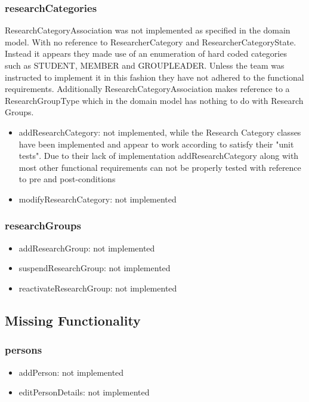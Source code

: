 \documentclass{article}
\begin{document}
		\subsubsection{researchCategories}
		ResearchCategoryAssociation was not implemented as specified in the domain model. With no reference to ResearcherCategory and ResearcherCategoryState. Instead it appears they made use of an enumeration of hard coded categories such as STUDENT, MEMBER and GROUPLEADER. Unless the team was instructed to implement it in this fashion they have not adhered to the functional requirements. Additionally ResearchCategoryAssociation makes reference to a ResearchGroupType which in the domain model has nothing to do with Research Groups.
			\begin{itemize}
			\item addResearchCategory: not implemented, while the Research Category classes have been implemented and appear to work according to satisfy their "unit tests". Due to their lack of implementation addResearchCategory along with most other functional requirements can not be properly tested with reference to pre and post-conditions
			\item modifyResearchCategory: not implemented
			\end{itemize}

		\subsubsection{researchGroups}
			\begin{itemize}
			\item addResearchGroup: not implemented
			\item suspendResearchGroup: not implemented
			\item reactivateResearchGroup: not implemented
			\end{itemize}


    \subsection{Missing Functionality}
	
		\subsubsection{persons} 
			\begin{itemize}
			\item addPerson: not implemented
			\item editPersonDetails: not implemented
			\end{itemize}
\end{document}
